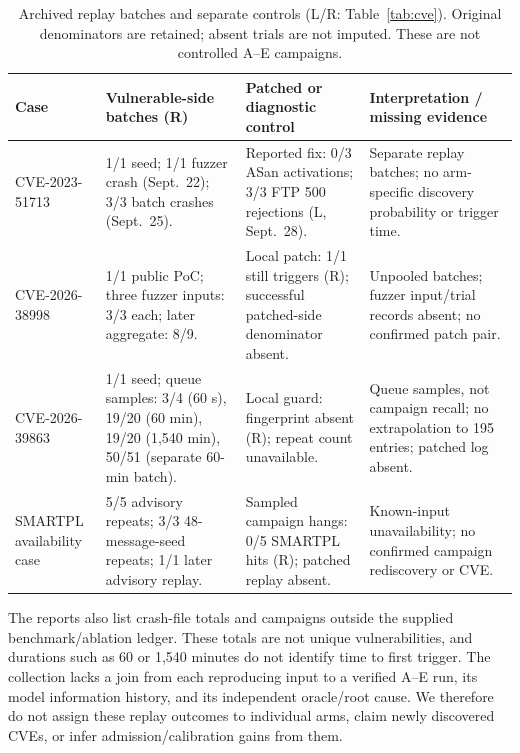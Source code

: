 \documentclass[final,5p,times,number]{elsarticle}
\begin{document}
\begin{table}[!tbp]
\centering\small
\caption{Archived replay batches and separate controls (L/R: Table~\ref{tab:cve}). Original denominators are retained; absent trials are not imputed. These are not controlled A--E campaigns.}
\label{tab:cveresults}
\begin{tabularx}{\textwidth}{@{}>{\raggedright\arraybackslash}p{} Y Y Y@{}}
\toprule
Case & Vulnerable-side batches (R) & Patched or diagnostic control & Interpretation / missing evidence \\
\midrule
\mbox{CVE-2023-51713} & 1/1 seed; 1/1 fuzzer crash (Sept.~22); 3/3 batch crashes (Sept.~25). & Reported fix: 0/3 ASan activations; 3/3 FTP 500 rejections (L, Sept.~28). & Separate replay batches; no arm-specific discovery probability or trigger time. \\
\addlinespace[3pt]
\mbox{CVE-2026-38998} & 1/1 public PoC; three fuzzer inputs: 3/3 each; later aggregate: 8/9. & Local patch: 1/1 still triggers (R); successful patched-side denominator absent. & Unpooled batches; fuzzer input/trial records absent; no confirmed patch pair. \\
\addlinespace[3pt]
\mbox{CVE-2026-39863} & 1/1 seed; queue samples: 3/4 (60 s), 19/20 (60 min), 19/20 (1,540 min), 50/51 (separate 60-min batch). & Local guard: fingerprint absent (R); repeat count unavailable. & Queue samples, not campaign recall; no extrapolation to 195 entries; patched log absent. \\
\addlinespace[3pt]
SMARTPL availability case & 5/5 advisory repeats; 3/3 48-message-seed repeats; 1/1 later advisory replay. & Sampled campaign hangs: 0/5 SMARTPL hits (R); patched replay absent. & Known-input unavailability; no confirmed campaign rediscovery or CVE. \\
\bottomrule
\end{tabularx}
\end{table}

The reports also list crash-file totals and campaigns outside the supplied benchmark/ablation ledger. These totals are not unique vulnerabilities, and durations such as 60 or 1,540 minutes do not identify time to first trigger. The collection lacks a join from each reproducing input to a verified A--E run, its model information history, and its independent oracle/root cause. We therefore do not assign these replay outcomes to individual arms, claim newly discovered CVEs, or infer admission/calibration gains from them.
\end{document}
